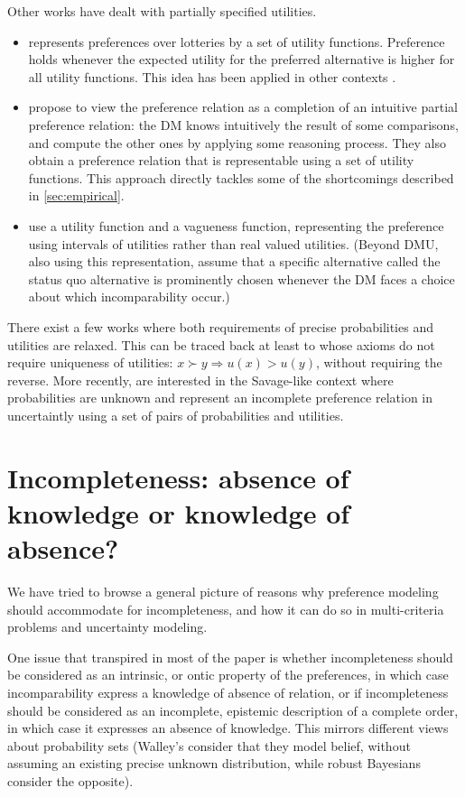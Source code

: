 \documentclass[french, english]{llncs}
\begin{document}
	Other works have dealt with partially specified utilities.
	\begin{itemize}
		\item \citet{dubra_expected_2004} represents preferences over lotteries by a set of utility functions. Preference holds whenever the expected utility for the preferred alternative is higher for all utility functions. This idea has been applied in other contexts \citep{ok_utility_2002}.
		\item \citet{dubra_model_2002} propose to view the preference relation as a completion of an intuitive partial preference relation: the \ac{DM} knows intuitively the result of some comparisons, and compute the other ones by applying some reasoning process. They also obtain a preference relation that is representable using a set of utility functions. This approach directly tackles some of the shortcomings described in \cref{sec:empirical}.
		\item \citet{manzini_representation_2008} use a utility function and a vagueness function, representing the preference using intervals of utilities rather than real valued utilities. (Beyond DMU, also using this representation, \citet{masatlioglu_rational_2005} assume that a specific alternative called the status quo alternative is prominently chosen whenever the \ac{DM} faces a choice about which incomparability occur.)
	\end{itemize}

	There exist a few works where both requirements of precise probabilities and utilities are relaxed. This can be traced back at least to \citet{aumann_utility_1962} whose axioms do not require uniqueness of utilities: $x \succ y ⇒ u(x) > u(y)$, without requiring the reverse. More recently, \citet{galaabaatar_subjective_2013} are interested in the Savage-like context where probabilities are unknown and represent an incomplete preference relation in uncertaintly using a set of pairs of probabilities and utilities.


	\section{Incompleteness: absence of knowledge or knowledge of absence?}
	
	We have tried to browse a general picture of reasons why preference modeling should accommodate for incompleteness, and how it can do so in multi-criteria problems and uncertainty modeling. 
	
	One issue that transpired in most of the paper is whether incompleteness should be considered as an intrinsic, or ontic property of the preferences, in which case incomparability express a knowledge of absence of relation, or if incompleteness should be considered as an incomplete, epistemic description of a complete order, in which case it expresses an absence of knowledge. This mirrors different views about probability sets (Walley's consider that they model belief, without assuming an existing precise unknown distribution, while robust Bayesians consider the opposite). 
	
\end{document}
